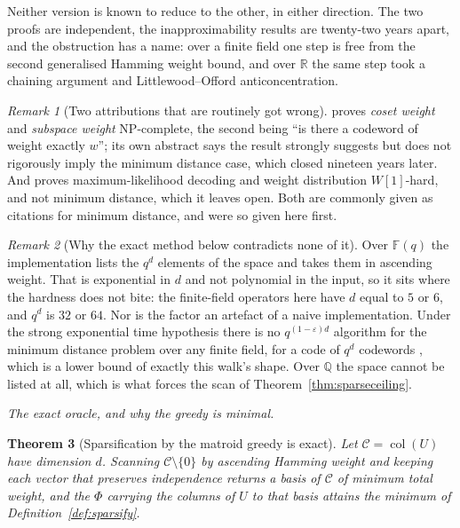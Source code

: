 \documentclass[11pt,reqno]{amsart}
\theoremstyle{plain}
\newtheorem{theorem}{Theorem}[section]
\theoremstyle{definition}
\theoremstyle{remark}
\newtheorem{remark}[theorem]{Remark}
\newcommand{\GF}{\mathbb{F}}
\newcommand{\col}{\operatorname{col}}
\begin{document}
Neither version is known to reduce to the other, in either direction. The two
proofs are independent, the inapproximability results are twenty-two years apart,
and the obstruction has a name: over a finite field one step is free from the
second generalised Hamming weight bound, and over $\mathbb{R}$ the same step took
a chaining argument and Littlewood--Offord anticoncentration.

\begin{remark}[Two attributions that are routinely got wrong]
\cite{berlekamp1978} proves \emph{coset weight} and \emph{subspace weight}
NP-complete, the second being ``is there a codeword of weight exactly $w$''; its
own abstract says the result strongly suggests but does not rigorously imply the
minimum distance case, which \cite{vardy1997} closed nineteen years later. And
\cite{downey1999} proves maximum-likelihood decoding and weight distribution
$W[1]$-hard, and not minimum distance, which it leaves open. Both are commonly
given as citations for minimum distance, and were so given here first.
\end{remark}

\begin{remark}[Why the exact method below contradicts none of it]\label{rem:notcontra}
Over $\GF(q)$ the implementation lists the $q^{d}$ elements of the space and
takes them in ascending weight. That is exponential in $d$ and not polynomial in
the input, so it sits where the hardness does not bite: the finite-field
operators here have $d$ equal to $5$ or $6$, and $q^{d}$ is $32$ or $64$. Nor is
the factor an artefact of a naive implementation. Under the strong exponential
time hypothesis there is no $q^{(1-\varepsilon)d}$ algorithm for the minimum
distance problem over any finite field, for a code of $q^{d}$ codewords
\cite{stephensdavidowitz2019}, which is a lower bound of exactly this walk's
shape. Over $\mathbb{Q}$ the space cannot be listed at all, which is what forces
the scan of Theorem~\ref{thm:sparseceiling}.
\end{remark}

\emph{The exact oracle, and why the greedy is minimal.}

\begin{theorem}[Sparsification by the matroid greedy is exact]\label{thm:sparseexact}
Let $\mathcal{C}=\col(U)$ have dimension $d$. Scanning $\mathcal{C}\setminus\{0\}$
by ascending Hamming weight and keeping each vector that preserves independence
returns a basis of $\mathcal{C}$ of minimum total weight, and the $\Phi$ carrying
the columns of $U$ to that basis attains the minimum of
Definition~\ref{def:sparsify}.
\end{theorem}
\end{document}
